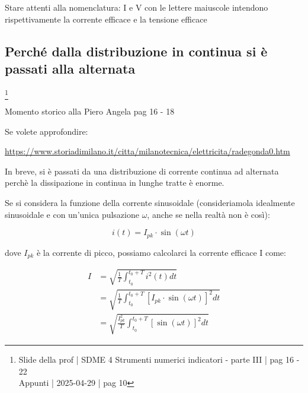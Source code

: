 \begin{tcolorbox}
Stare attenti alla nomenclatura: I e V con le lettere maiuscole intendono rispettivamente la corrente efficace e la tensione efficace    
\end{tcolorbox}

\newpage 

\subsection{Perché dalla distribuzione in continua si è passati alla alternata}
\footnote{Slide della prof | SDME 4 Strumenti numerici indicatori - parte III | pag  16 - 22 \\  
Appunti | 2025-04-29 | pag 10} 

\begin{tcolorbox}
    Momento storico alla Piero Angela pag 16 - 18 

    Se volete approfondire: 

    \url{https://www.storiadimilano.it/citta/milanotecnica/elettricita/radegonda0.htm}
\end{tcolorbox}

In breve, si è passati da una distribuzione di corrente continua ad alternata perchè la dissipazione in continua in lunghe tratte è enorme. \newline 

Se si considera la funzione della corrente sinusoidale (consideriamola idealmente sinusoidale e con un'unica pulsazione $\omega$, anche se nella realtà non è così): 

{
    \Large 
    \begin{equation}
        i(t) = I_{pk} \cdot \sin(\omega t)
    \end{equation}
} 

dove $I_{pk}$ è la corrente di picco, possiamo calcolarci la corrente efficace I come: 

{
    \Large 
    \begin{equation}
        \begin{split}
        I 
        &= 
        \sqrt
        {
            \frac{1}{T}
            \int_{t_0}^{t_0 + T} 
            i^{2} (t) dt
        }
        \\ 
        &=
        \sqrt
        {
            \frac{1}{T}
            \int_{t_0}^{t_0 + T} 
            \left[I_{pk} \cdot \sin(\omega t) \right] ^{2} 
            dt
        } 
        \\ 
        &=
        \sqrt
        {
            \frac{I_{pk}^{2}}{T}
            \int_{t_0}^{t_0 + T} 
            \left[ \sin(\omega t) \right] ^{2} 
            dt
        }  
        \end{split}
    \end{equation}
}


